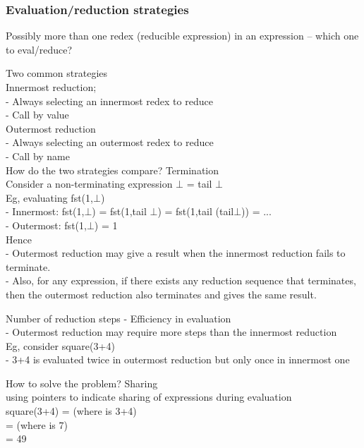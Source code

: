 \documentclass[tikz,border=10pt]{project_plan}
\begin{document}
\subsubsection{Evaluation/reduction strategies}

Possibly more than one redex (reducible expression)
in an expression – which one to eval/reduce?

Two common strategies\\
Innermost reduction;\\
- Always selecting an innermost redex to reduce\\
- Call by value\\
Outermost reduction\\
- Always selecting an outermost redex to reduce\\
- Call by name\\

How do the two strategies compare? Termination\\
Consider a non-terminating expression $\bot$ = tail $\bot$\\
Eg, evaluating fst(1,$\bot$)\\
- Innermost: fst(1,$\bot$) = fst(1,tail $\bot$) = fst(1,tail (tail$\bot$)) = ...\\
- Outermost: fst(1,$\bot$) = 1\\
Hence\\
- Outermost reduction may give a result when the innermost
reduction fails to terminate.\\
- Also, for any expression, if there exists any reduction sequence
that terminates, then the outermost reduction also terminates and
gives the same result.

Number of reduction steps - Efficiency in evaluation\\
- Outermost reduction may require more steps than the innermost reduction\\
Eg, consider square(3+4)\\
- 3+4 is evaluated twice in outermost reduction but only once in innermost one

How to solve the problem? Sharing\\
using pointers to indicate sharing of expressions during evaluation\\
square(3+4) = \textperiodcentered * \textperiodcentered (where \textperiodcentered is 3+4)\\
= \textperiodcentered * \textperiodcentered (where \textperiodcentered is 7)\\
= 49
\end{document}
